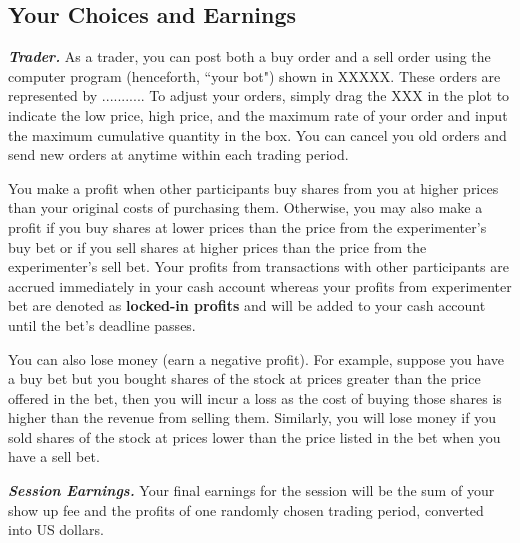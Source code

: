 \documentclass{article}
\begin{document}
\subsection*{Your Choices and Earnings}

\noindent
\textit{\textbf{Trader.}} As a trader, you can post both a buy order and a sell order using the computer program (henceforth, ``your bot") shown in XXXXX. These orders are represented by ........... To adjust your orders, simply drag the XXX in the plot to indicate the low price, high price, and the maximum rate of your order and input the maximum cumulative quantity in the box. You can cancel you old orders and send new orders at anytime within each trading period. 

\noindent
You make a profit when other participants buy shares from you at higher prices than your original costs of purchasing them. Otherwise, you may also make a profit if you buy shares at lower prices than the price from the experimenter's buy bet or if you sell shares at higher prices than the price from the experimenter's sell bet. Your profits from transactions with other participants are accrued immediately in your cash account whereas your profits from experimenter bet are denoted as \textbf{locked-in profits} and will be added to your cash account until the bet's deadline passes. 

\noindent
You can also lose money (earn a negative profit). For example, suppose you have a buy bet but you bought shares of the stock at prices greater than the price offered in the bet, then you will incur a loss as the cost of buying those shares is higher than the revenue from selling them. Similarly, you will lose money if you sold shares of the stock at prices lower than the price listed in the bet when you have a sell bet. 

\noindent
\textit{\textbf{Session Earnings.}} Your final earnings for the session will be the sum of your show up fee and the profits of one randomly chosen trading period, converted into US dollars. 
\end{document}
